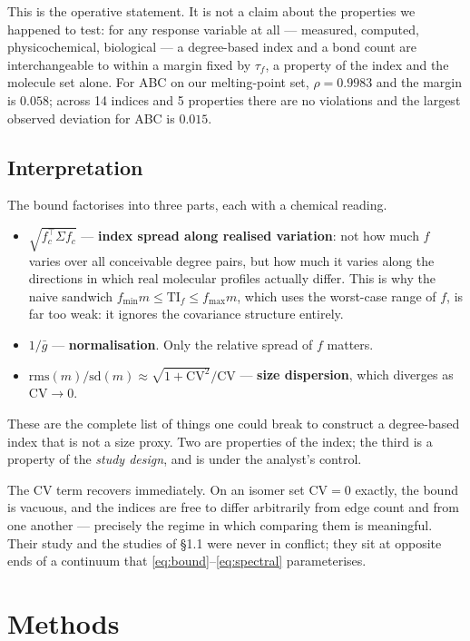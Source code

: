 \documentclass[11pt,a4paper]{article}
\theoremstyle{plain}
\newcommand{\TI}{\mathrm{TI}}
\newcommand{\CV}{\mathrm{CV}}
\newcommand{\rms}{\mathrm{rms}}
\newcommand{\sd}{\mathrm{sd}}
\begin{document}
This is the operative statement. It is not a claim about the properties we happened to
test: for any response variable at all --- measured, computed, physicochemical,
biological --- a degree-based index and a bond count are interchangeable to within a
margin fixed by $\tau_f$, a property of the index and the molecule set alone. For ABC on
our melting-point set, $\rho=0.9983$ and the margin is $0.058$; across 14 indices and 5
properties there are no violations and the largest observed deviation for ABC is $0.015$.

\subsection{Interpretation}

The bound factorises into three parts, each with a chemical reading.
\begin{itemize}\itemsep2pt
\item $\sqrt{f_c^{\!\top}\Sigma f_c}$ --- \textbf{index spread along realised variation}:
not how much $f$ varies over all conceivable degree pairs, but how much it varies along
the directions in which real molecular profiles actually differ. This is why the naive
sandwich $f_{\min}m\le\TI_f\le f_{\max}m$, which uses the worst-case range of $f$, is far
too weak: it ignores the covariance structure entirely.
\item $1/\bar g$ --- \textbf{normalisation}. Only the relative spread of $f$ matters.
\item $\rms(m)/\sd(m)\approx\sqrt{1+\CV^2}/\CV$ --- \textbf{size dispersion}, which
diverges as $\CV\to0$.
\end{itemize}
These are the complete list of things one could break to construct a degree-based index
that is not a size proxy. Two are properties of the index; the third is a property of the
\emph{study design}, and is under the analyst's control.

The $\CV$ term recovers \citet{gutman2013} immediately. On an isomer set $\CV=0$ exactly,
the bound is vacuous, and the indices are free to differ arbitrarily from edge count and
from one another --- precisely the regime in which comparing them is meaningful. Their
study and the studies of \S1.1 were never in conflict; they sit at opposite ends of a
continuum that \eqref{eq:bound}--\eqref{eq:spectral} parameterises.

\section{Methods}
\end{document}
